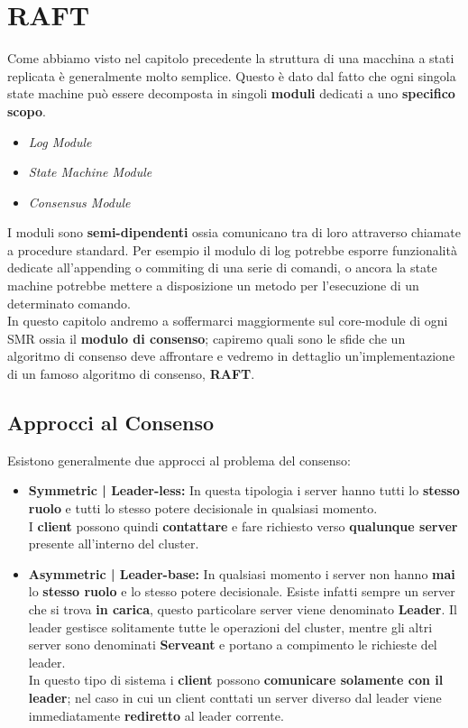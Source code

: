 \chapter{RAFT}
	Come abbiamo visto nel capitolo precedente la struttura di una macchina a stati replicata è generalmente molto semplice. Questo è dato dal fatto che ogni singola state machine può essere decomposta in singoli \textbf{moduli} dedicati a uno \textbf{specifico scopo}.
	\begin{itemize}
		\item{\textit{Log Module}}
		\item{\textit{State Machine Module}}
		\item{\textit{Consensus Module}}
	\end{itemize}
	I moduli sono \textbf{semi-dipendenti} ossia comunicano tra di loro attraverso chiamate a procedure standard. Per esempio il modulo di log potrebbe esporre funzionalità dedicate all'appending o commiting di una serie di comandi, o ancora la state machine potrebbe mettere a disposizione un metodo per l'esecuzione di un determinato comando.\\
	In questo capitolo andremo a soffermarci maggiormente sul core-module di ogni SMR ossia il \textbf{modulo di consenso}; capiremo quali sono le sfide che un algoritmo di consenso deve affrontare e vedremo in dettaglio un'implementazione di un famoso algoritmo di consenso, \textbf{RAFT}.
	
	\section{Approcci al Consenso}
	Esistono generalmente due approcci al problema del consenso:
	\begin{itemize}
		\item{\textbf{Symmetric | Leader-less:}}
		In questa tipologia i server hanno tutti lo \textbf{stesso ruolo} e tutti lo stesso potere decisionale in qualsiasi momento.\\
		I \textbf{client} possono quindi \textbf{contattare} e fare richiesto verso \textbf{qualunque server} presente all'interno del cluster. 
		\item{\textbf{Asymmetric | Leader-base:}}
		In qualsiasi momento i server non hanno \textbf{mai} lo \textbf{stesso ruolo} e lo stesso potere decisionale. Esiste infatti sempre un server che si trova \textbf{in carica}, questo particolare server viene denominato \textbf{Leader}. Il leader gestisce solitamente tutte le operazioni del cluster, mentre gli altri server sono denominati \textbf{Serveant} e portano a compimento le richieste del leader.\\
		In questo tipo di sistema i \textbf{client} possono \textbf{comunicare solamente con il leader}; nel caso in cui un client conttati un server diverso dal leader viene immediatamente \textbf{rediretto} al leader corrente.
	\end{itemize}
